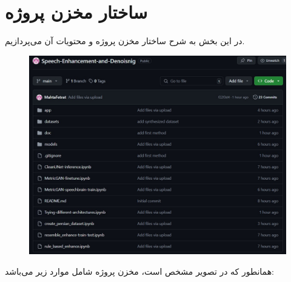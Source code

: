 \documentclass[fleqn]{report}
\begin{document}
\chapter{ساختار مخزن پروژه}
در این بخش به شرح ساختار مخزن پروژه و محتویات آن می‌پردازیم.

\begin{figure}[h]

    \centering
    \includegraphics[width=\textwidth, keepaspectratio]{images/repo.jpg}
    
    \caption{}
    \label{fig:repo}
\end{figure}

همانطور که در تصویر مشخص است، مخزن پروژه شامل موارد زیر می‌باشد:
\end{document}

